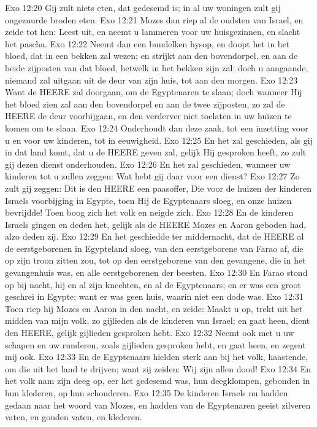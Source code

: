 Exo 12:20  Gij zult niets eten, dat gedesemd is; in al uw woningen zult gij ongezuurde broden eten.
Exo 12:21  Mozes dan riep al de oudsten van Israel, en zeide tot hen: Leest uit, en neemt u lammeren voor uw huisgezinnen, en slacht het pascha.
Exo 12:22  Neemt dan een bundelken hysop, en doopt het in het bloed, dat in een bekken zal wezen; en strijkt aan den bovendorpel, en aan de beide zijposten van dat bloed, hetwelk in het bekken zijn zal; doch u aangaande, niemand zal uitgaan uit de deur van zijn huis, tot aan den morgen.
Exo 12:23  Want de HEERE zal doorgaan, om de Egyptenaren te slaan; doch wanneer Hij het bloed zien zal aan den bovendorpel en aan de twee zijposten, zo zal de HEERE de deur voorbijgaan, en den verderver niet toelaten in uw huizen te komen om te slaan.
Exo 12:24  Onderhoudt dan deze zaak, tot een inzetting voor u en voor uw kinderen, tot in eeuwigheid.
Exo 12:25  En het zal geschieden, als gij in dat land komt, dat u de HEERE geven zal, gelijk Hij gesproken heeft, zo zult gij dezen dienst onderhouden.
Exo 12:26  En het zal geschieden, wanneer uw kinderen tot u zullen zeggen: Wat hebt gij daar voor een dienst?
Exo 12:27  Zo zult gij zeggen: Dit is den HEERE een paasoffer, Die voor de huizen der kinderen Israels voorbijging in Egypte, toen Hij de Egyptenaars sloeg, en onze huizen bevrijdde! Toen boog zich het volk en neigde zich.
Exo 12:28  En de kinderen Israels gingen en deden het, gelijk als de HEERE Mozes en Aaron geboden had, alzo deden zij.
Exo 12:29  En het geschiedde ter middernacht, dat de HEERE al de eerstgeborenen in Egypteland sloeg, van den eerstgeborene van Farao af, die op zijn troon zitten zou, tot op den eerstgeborene van den gevangene, die in het gevangenhuis was, en alle eerstgeborenen der beesten.
Exo 12:30  En Farao stond op bij nacht, hij en al zijn knechten, en al de Egyptenaars; en er was een groot geschrei in Egypte; want er was geen huis, waarin niet een dode was.
Exo 12:31  Toen riep hij Mozes en Aaron in den nacht, en zeide: Maakt u op, trekt uit het midden van mijn volk, zo gijlieden als de kinderen van Israel; en gaat heen, dient den HEERE, gelijk gijlieden gesproken hebt.
Exo 12:32  Neemt ook met u uw schapen en uw runderen, zoals gijlieden gesproken hebt, en gaat heen, en zegent mij ook.
Exo 12:33  En de Egyptenaars hielden sterk aan bij het volk, haastende, om die uit het land te drijven; want zij zeiden: Wij zijn allen dood!
Exo 12:34  En het volk nam zijn deeg op, eer het gedesemd was, hun deegklompen, gebonden in hun klederen, op hun schouderen.
Exo 12:35  De kinderen Israels nu hadden gedaan naar het woord van Mozes, en hadden van de Egyptenaren geeist zilveren vaten, en gouden vaten, en klederen.
